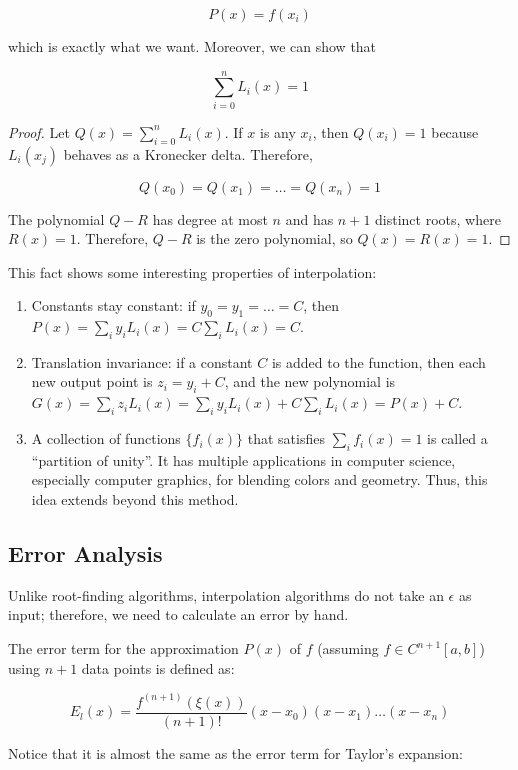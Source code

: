 \documentclass[12pt]{article}
\theoremstyle{plain}
\theoremstyle{remark}
\begin{document}
\[
  P(x) = f(x_i)
\]

which is exactly what we want. Moreover, we can show that

\[
  \sum_{i = 0}^n L_i(x) = 1
\]

\begin{proof}
Let $Q(x) = \sum_{i = 0}^n L_i(x)$. If $x$ is any $x_i$, then $Q(x_i) = 1$ because $L_i(x_j)$ behaves as a Kronecker delta. Therefore,

\[
  Q(x_0) = Q(x_1) = \dots = Q(x_n) = 1
\]

The polynomial $Q - R$ has degree at most $n$ and has $n + 1$ distinct roots, where $R(x) = 1$. Therefore, $Q - R$ is the zero polynomial, so $Q(x) = R(x) = 1$.
\end{proof}

This fact shows some interesting properties of interpolation:
\begin{enumerate}
        \item Constants stay constant: if $y_0 = y_1 = \dots = C$, then $P(x) = \sum_i y_iL_i(x) = C \sum_iL_i(x) = C$.
        \item Translation invariance: if a constant $C$ is added to the function, then each new output point is $z_i = y_i + C$, and the new polynomial is $G(x) = \sum_i z_iL_i(x) = \sum_i y_iL_i(x) + C\sum_iL_i(x) = P(x) + C$.
        \item A collection of functions $\{f_i(x)\}$ that satisfies $\sum_i f_i(x) = 1$ is called a ``partition of unity''. It has multiple applications in computer science, especially computer graphics, for blending colors and geometry. Thus, this idea extends beyond this method.
\end{enumerate}

\subsection{Error Analysis}\label{sec:error}

Unlike root-finding algorithms, interpolation algorithms do not take an $\epsilon$ as input; therefore, we need to calculate an error by hand.

The error term for the approximation $P(x)$ of $f$ (assuming $f \in C^{n + 1}[a, b]$) using $n + 1$ data points is defined as:

\[
  E_l(x) = \frac{f^{(n + 1)}(\xi(x))}{(n + 1)!}(x - x_0)(x - x_1)\dots(x - x_n)
\]

Notice that it is almost the same as the error term for Taylor's expansion:
\end{document}
